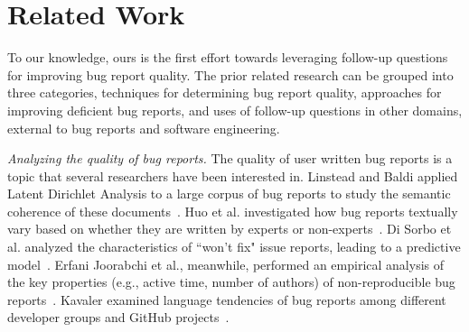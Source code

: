 \section{Related Work}
To our knowledge, ours is the first effort towards leveraging follow-up questions for improving bug report quality. The prior related research can be grouped into three categories, techniques for determining bug report quality, approaches for improving deficient bug reports, and uses of follow-up questions in other domains, external to bug reports and software engineering.

\noindent
{\em Analyzing the quality of bug reports.} The quality of user written bug reports is a topic that several researchers have been interested in. Linstead and Baldi applied Latent Dirichlet Analysis to a large corpus of bug reports to study the semantic coherence of these documents~\cite{linstead09mining}. Huo et al. investigated how bug reports textually vary based on whether they are written by experts or non-experts~\cite{Huo2014AnES}. Di Sorbo et al. analyzed the characteristics of ``won't fix" issue reports, leading to a predictive model~\cite{Sorbo2019WontWF}. Erfani Joorabchi et al., meanwhile, performed an empirical analysis of the key properties (e.g., active time, number of authors) of non-reproducible bug reports~\cite{erfani2014works}. Kavaler examined language tendencies of bug reports among different developer groups and GitHub projects~\cite{kavaler2017language}.

